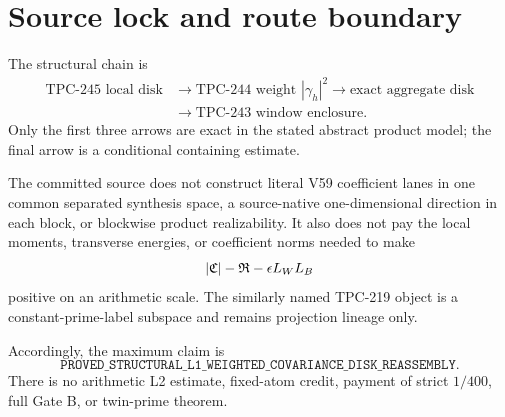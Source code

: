 \section{Source lock and route boundary}

The structural chain is
\[
\begin{aligned}
 \text{TPC-245 local disk}
 &\longrightarrow \text{TPC-244 weight }|\gamma_h|^2
 \longrightarrow \text{exact aggregate disk}\\
 &\longrightarrow \text{TPC-243 window enclosure}.
\end{aligned}
\]
Only the first three arrows are exact in the stated abstract product model;
the final arrow is a conditional containing estimate.

The committed source does not construct literal V59 coefficient lanes in one
common separated synthesis space, a source-native one-dimensional direction in
each block, or blockwise product realizability.  It also does not pay the local
moments, transverse energies, or coefficient norms needed to make
\[
 |\mathfrak{C}|-\mathfrak{R}-\epsilon L_WL_B
\]
positive on an arithmetic scale.  The similarly named TPC-219 object is a
constant-prime-label subspace and remains projection lineage only.

Accordingly, the maximum claim is
\[
 \texttt{PROVED\_STRUCTURAL\_L1\_WEIGHTED\_COVARIANCE\_DISK\_REASSEMBLY}.
\]
There is no arithmetic L2 estimate, fixed-atom credit, payment of strict
$1/400$, full Gate B, or twin-prime theorem.
